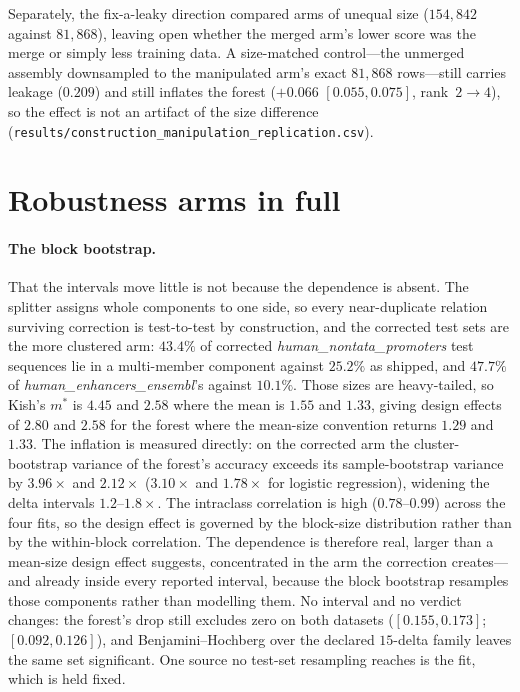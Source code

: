 \documentclass[11pt,a4paper]{article}
\begin{document}
Separately, the fix-a-leaky direction compared arms of unequal size ($154{,}842$ against $81{,}868$), leaving open whether the merged arm's lower score was the merge or simply less training data. A size-matched control---the unmerged assembly downsampled to the manipulated arm's exact $81{,}868$ rows---still carries leakage ($0.209$) and still inflates the forest ($+0.066$ $[0.055,0.075]$, rank~$2\to4$), so the effect is not an artifact of the size difference (\texttt{results/construction\_manipulation\_replication.csv}).

\section{Robustness arms in full}\label{sec:s-robust}
\paragraph{The block bootstrap.} That the intervals move little is not because the dependence is absent. The splitter assigns whole components to one side, so every near-duplicate relation surviving correction is test-to-test by construction, and the corrected test sets are the more clustered arm: $43.4\%$ of corrected \textit{human\_nontata\_promoters} test sequences lie in a multi-member component against $25.2\%$ as shipped, and $47.7\%$ of \textit{human\_enhancers\_ensembl}'s against $10.1\%$. Those sizes are heavy-tailed, so Kish's $m^{*}$ is $4.45$ and $2.58$ where the mean is $1.55$ and $1.33$, giving design effects of $2.80$ and $2.58$ for the forest where the mean-size convention returns $1.29$ and $1.33$. The inflation is measured directly: on the corrected arm the cluster-bootstrap variance of the forest's accuracy exceeds its sample-bootstrap variance by $3.96\times$ and $2.12\times$ ($3.10\times$ and $1.78\times$ for logistic regression), widening the delta intervals $1.2$--$1.8\times$. The intraclass correlation is high ($0.78$--$0.99$) across the four fits, so the design effect is governed by the block-size distribution rather than by the within-block correlation. The dependence is therefore real, larger than a mean-size design effect suggests, concentrated in the arm the correction creates---and already inside every reported interval, because the block bootstrap resamples those components rather than modelling them. No interval and no verdict changes: the forest's drop still excludes zero on both datasets ($[0.155,0.173]$; $[0.092,0.126]$), and Benjamini--Hochberg over the declared $15$-delta family leaves the same set significant. One source no test-set resampling reaches is the fit, which is held fixed.
\end{document}
